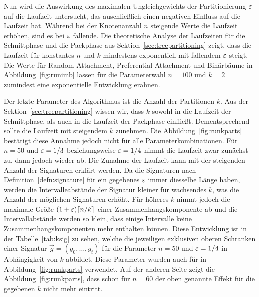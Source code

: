 Nun wird die Auswirkung des maximalen Ungleichgewichts der Partitionierung $\varepsilon$ auf die Laufzeit untersucht, das auschließlich einen negativen Einfluss auf die Laufzeit hat.
Während bei der Knotenanzahl $n$ steigende Werte die Laufzeit erhöhen, sind es bei $\varepsilon$ fallende.
Die theoretische Analyse der Laufzeiten für die Schnittphase und die Packphase aus Sektion~\ref{sec:treepartitioning} zeigt, dass die Laufzeit für konstantes $n$ und $k$ mindestens exponentiell mit fallendem $\varepsilon$ steigt.
Die Werte für Random Attachment, Preferential Attachment und Binärbäume in Abbildung~\ref{fig:runimb} lassen für die Parameterwahl $n = 100$ und $k = 2$ zumindest eine exponentielle Entwicklung erahnen.

Der letzte Parameter des Algorithmus ist die Anzahl der Partitionen $k$. 
Aus der Sektion~\ref{sec:treepartitioning} wissen wir, dass $k$ sowohl in die Laufzeit der Schnittphase, als auch in die Laufzeit der Packphase einfließt.
Dementsprechend sollte die Laufzeit mit steigendem $k$ zunehmen.
Die Abbildung~\ref{fig:runkparts} bestätigt diese Annahme jedoch nicht für alle Parameterkombinationen.
Für $n=50$ und $\varepsilon=1/3$ beziehungsweise $\varepsilon=1/4$ nimmt die Laufzeit zwar zunächst zu, dann jedoch wieder ab.
Die Zunahme der Laufzeit kann mit der steigenden Anzahl der Signaturen erklärt werden.
Da die Signaturen nach Definition~\ref{defn:signature} für ein gegebenes $\varepsilon$ immer diesselbe Länge haben, werden die Intervalleabstände der Signatur kleiner für wachsendes $k$, was die Anzahl der möglichen Signaturen erhöht.
Für höheres $k$ nimmt jedoch die maximale Größe $(1 + \varepsilon) \lceil n/k\rceil$ einer Zusammenhangskomponente ab und die Intervallabstände werden so klein, dass einige Intervalle keine Zusammenhangskomponenten mehr enthalten können. 
Diese Entwicklung ist in der Tabelle~\ref{tab:ksig} zu sehen, welche die jeweiligen exklusiven oberen Schranken einer Signatur $\vec{g} = (g_0, \ldots, g_t)$ für die Parameter $n = 50$ und $\varepsilon = 1/4$ in Abhängigkeit von $k$ abbildet.
Diese Parameter wurden auch für in Abbildung~\ref{fig:runkparts} verwendet.
Auf der anderen Seite zeigt die Abbildung~\ref{fig:runkparts}, dass schon für $n=60$ der oben genannte Effekt für die gegebenen $k$ nicht mehr eintritt. 

